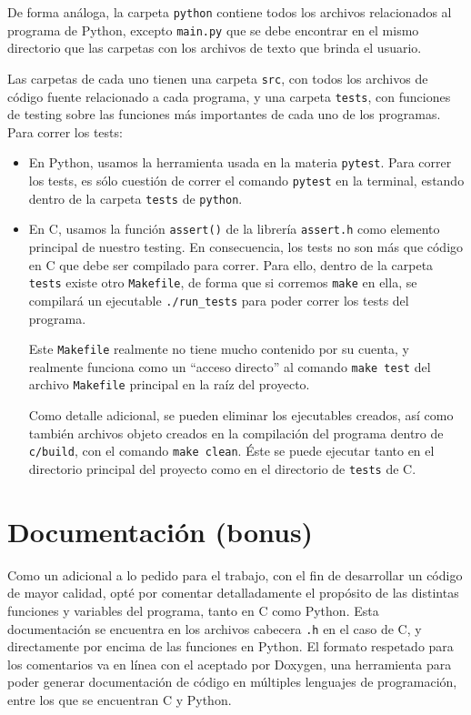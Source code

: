 \documentclass[a4paper]{article}
\begin{document}
De forma análoga, la carpeta \texttt{python} contiene todos los archivos relacionados al programa de Python, excepto \texttt{main.py} que se debe encontrar en el mismo directorio que las carpetas con los archivos de texto que brinda el usuario.

Las carpetas de cada uno tienen una carpeta \texttt{src}, con todos los archivos de código fuente relacionado a cada programa, y una carpeta \texttt{tests}, con funciones de testing sobre las funciones más importantes de cada uno de los programas. Para correr los tests:

\begin{itemize}
    \item En Python, usamos la herramienta usada en la materia \texttt{pytest}. Para correr los tests, es sólo cuestión de correr el comando \texttt{pytest} en la terminal, estando dentro de la carpeta \texttt{tests} de \texttt{python}.
    \item En C, usamos la función \texttt{assert()} de la librería \texttt{assert.h} como elemento principal de nuestro testing. En consecuencia, los tests no son más que código en C que debe ser compilado para correr. Para ello, dentro de la carpeta \texttt{tests} existe otro \texttt{Makefile}, de forma que si corremos \texttt{make} en ella, se compilará un ejecutable \texttt{./run\_tests} para poder correr los tests del programa.

        Este \texttt{Makefile} realmente no tiene mucho contenido por su cuenta, y realmente funciona como un ``acceso directo'' al comando \texttt{make test} del archivo \texttt{Makefile} principal en la raíz del proyecto.

        Como detalle adicional, se pueden eliminar los ejecutables creados, así como también archivos objeto creados en la compilación del programa dentro de \texttt{c/build}, con el comando \texttt{make clean}. Éste se puede ejecutar tanto en el directorio principal del proyecto como en el directorio de \texttt{tests} de C.
\end{itemize}

\section{Documentación (bonus)}

Como un adicional a lo pedido para el trabajo, con el fin de desarrollar un código de mayor calidad, opté por comentar detalladamente el propósito de las distintas funciones y variables del programa, tanto en C como Python. Esta documentación se encuentra en los archivos cabecera \texttt{.h} en el caso de C, y directamente por encima de las funciones en Python. El formato respetado para los comentarios va en línea con el aceptado por Doxygen, una herramienta para poder generar documentación de código en múltiples lenguajes de programación, entre los que se encuentran C y Python. 
\end{document}

